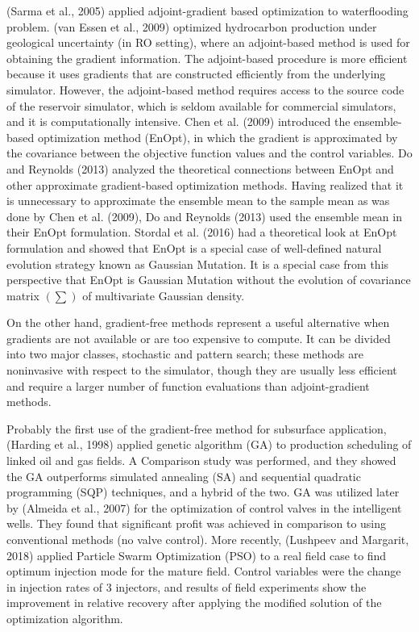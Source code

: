 \documentclass[]{elsarticle} %
\begin{document}
(Sarma et al., 2005) applied adjoint-gradient based optimization to waterflooding problem. (van Essen et al., 2009) optimized hydrocarbon production under geological uncertainty (in RO setting), where an adjoint-based method is used for obtaining the gradient information. The adjoint-based procedure is more efficient because it uses gradients that are constructed efficiently from the underlying simulator. However, the adjoint-based method requires access to the source code of the reservoir simulator, which is seldom available for commercial simulators, and it is computationally intensive. Chen et al. (2009) introduced the ensemble-based optimization method (EnOpt), in which the gradient is approximated by the covariance between the objective function values and the control variables. Do and Reynolds (2013) analyzed the theoretical connections between EnOpt and other approximate gradient-based optimization methods. Having realized that it is unnecessary to approximate the ensemble mean to the sample mean as was done by Chen et al. (2009), Do and Reynolds (2013) used the ensemble mean in their EnOpt formulation. Stordal et al. (2016) had a theoretical look at EnOpt formulation and showed that EnOpt is a special case of well-defined natural evolution strategy known as Gaussian Mutation. It is a special case from this perspective that EnOpt is Gaussian Mutation without the evolution of covariance matrix \((\sum)\) of multivariate Gaussian density.

On the other hand, gradient-free methods represent a useful alternative when gradients are not available or are too expensive to compute. It can be divided into two major classes, stochastic and pattern search; these methods are noninvasive with respect to the simulator, though they are usually less efficient and require a larger number of function evaluations than adjoint-gradient methods.

Probably the first use of the gradient-free method for subsurface application, (Harding et al., 1998) applied genetic algorithm (GA) to production scheduling of linked oil and gas fields. A Comparison study was performed, and they showed the GA outperforms simulated annealing (SA) and sequential quadratic programming (SQP) techniques, and a hybrid of the two. GA was utilized later by (Almeida et al., 2007) for the optimization of control valves in the intelligent wells. They found that significant profit was achieved in comparison to using conventional methods (no valve control). More recently, (Lushpeev and Margarit, 2018) applied Particle Swarm Optimization (PSO) to a real field case to find optimum injection mode for the mature field. Control variables were the change in injection rates of 3 injectors, and results of field experiments show the improvement in relative recovery after applying the modified solution of the optimization algorithm.
\end{document}
